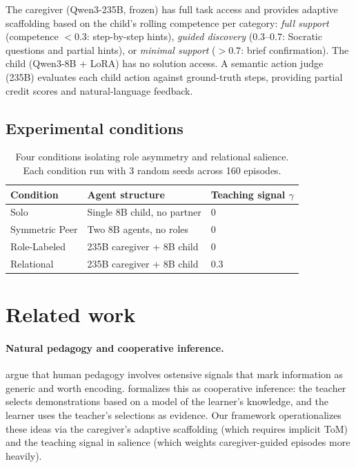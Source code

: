 \documentclass{article}
\begin{document}
The caregiver (Qwen3-235B, frozen) has full task access and provides adaptive scaffolding based on the child's rolling competence per category: \emph{full support} (competence $<0.3$: step-by-step hints), \emph{guided discovery} ($0.3$--$0.7$: Socratic questions and partial hints), or \emph{minimal support} ($>0.7$: brief confirmation). The child (Qwen3-8B + LoRA) has no solution access. A semantic action judge (235B) evaluates each child action against ground-truth steps, providing partial credit scores and natural-language feedback.

\subsection{Experimental conditions}

\begin{table}[h]
  \caption{Four conditions isolating role asymmetry and relational salience. Each condition run with 3 random seeds across 160 episodes.}
  \label{tab:conditions}
  \centering
  \begin{tabular}{lll}
    \toprule
    \textbf{Condition} & \textbf{Agent structure} & \textbf{Teaching signal $\gamma$} \\
    \midrule
    Solo & Single 8B child, no partner & 0 \\
    Symmetric Peer & Two 8B agents, no roles & 0 \\
    Role-Labeled & 235B caregiver + 8B child & 0 \\
    Relational & 235B caregiver + 8B child & 0.3 \\
    \bottomrule
  \end{tabular}
\end{table}

\section{Related work}

\paragraph{Natural pedagogy and cooperative inference.} \citet{csibra2009natural} argue that human pedagogy involves ostensive signals that mark information as generic and worth encoding. \citet{gweon2021inferential} formalizes this as cooperative inference: the teacher selects demonstrations based on a model of the learner's knowledge, and the learner uses the teacher's selections as evidence. Our framework operationalizes these ideas via the caregiver's adaptive scaffolding (which requires implicit ToM) and the teaching signal in salience (which weights caregiver-guided episodes more heavily).
\end{document}
